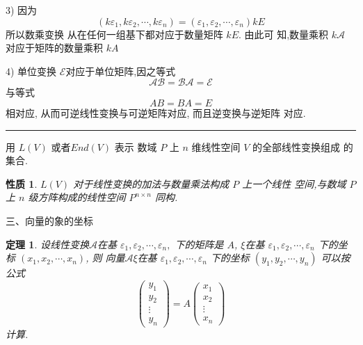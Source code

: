 \documentclass[13pt]{beamer}
\newtheorem{thm}{定理}
\newtheorem*{prop}{性质}
\def\qed{\nopagebreak\hfill{\rule{4pt}{7pt}}\medbreak}
\def\A{\mathscr{A}}
\def\E{\mathscr{E}}
\begin{document}
\begin{frame}
	3) 因为
	\[
	\left(k \varepsilon_{1}, k \varepsilon_{2}, \cdots, k \varepsilon_{n}\right)=\left(\varepsilon_{1}, \varepsilon_{2}, \cdots, \varepsilon_{n}\right) k E
	\]
	所以数乘变换 从在任何一组基下都对应于数量矩阵 $k {E}$. 由此可 知,数量乘积 $k \A$ 对应于矩阵的数量乘积 $k {A}$
	
	4) 单位变换 $\E$对应于单位矩阵,因之等式
	\[
	\mathscr{A} \mathscr{B}=\mathscr{B} \mathscr{A}=\mathscr{E}
	\]
	与等式
	\[
	{A B}={B A}={E}
	\]
	相对应, 从而可逆线性变换与可逆矩阵对应, 而且逆变换与逆矩阵 对应. 
	\qed
\end{frame}


\begin{frame}
用 $L(V)$ 或者$End(V)$	表示 数域 $P$ 上 $n$ 维线性空间 $V$ 的全部线性变换组成	的集合.
	

\begin{prop}
$L(V)$ 对于线性变换的加法与数量乘法构成 $P$ 上一个线性 空间,与数域 $P$ 上 $n$ 级方阵构成的线性空间 $P^{n \times n}$ 同构. 
\end{prop}	

\end{frame}


\begin{frame}{三、向量的象的坐标}

\begin{thm}
设线性变换$\A$在基 ${\varepsilon}_{1}, {\varepsilon}_{2}, \cdots, {\varepsilon}_{n},$ 下的矩阵是 ${A}$,  $\xi$在基
${\varepsilon}_{1}, {\varepsilon}_{2}, \cdots, {\varepsilon}_{n}$ 下的坐标 $\left(x_{1}, x_{2}, \cdots, x_{n}\right)$,
则
向量$\A \xi$在基
${\varepsilon}_{1}, {\varepsilon}_{2}, \cdots, {\varepsilon}_{n}$ 下的坐标 $\left(y_{1}, y_{2}, \cdots, y_{n}\right)$ 可以按公式
\[
\left(\begin{array}{c}
y_{1} \\
y_{2} \\
\vdots \\
y_{n}
\end{array}\right)=A\left(\begin{array}{c}
x_{1} \\
x_{2} \\
\vdots \\
x_{n}
\end{array}\right)
\]
计算. 
\end{thm}
\end{frame}
\end{document}
